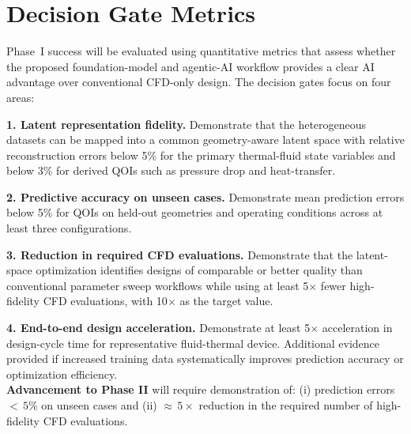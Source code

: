 \section{Decision Gate Metrics}

%
%
%
%

\noindent
Phase~I success will be evaluated using quantitative metrics that assess
whether the proposed foundation-model and agentic-AI workflow provides a clear
AI advantage over conventional CFD-only design. The decision gates focus on
four areas: 

\noindent
{\bf 1. Latent representation fidelity.} 
Demonstrate that the heterogeneous datasets can be mapped into a common
geometry-aware latent space with relative reconstruction errors below 5\% for
the primary thermal-fluid state variables and below 3\% for derived QOIs such
as pressure drop and heat-transfer.

\noindent
{\bf 2. Predictive accuracy on unseen cases.} 
Demonstrate mean prediction errors below 5\% for QOIs on held-out geometries
and operating conditions across at least three configurations.

\noindent
{\bf 3. Reduction in required CFD evaluations.} 
Demonstrate that the latent-space optimization identifies designs of comparable
or better quality than conventional parameter sweep workflows while using at
least 5$\times$ fewer high-fidelity CFD evaluations, with 10$\times$ as the
target value.

\noindent
{\bf 4. End-to-end design acceleration.} 
Demonstrate at least 5$\times$ acceleration in design-cycle time for
representative fluid-thermal device.  Additional evidence provided if increased
training data systematically improves prediction accuracy or optimization
efficiency.
\\[-2ex]


\noindent
{\bf Advancement to Phase II} will require demonstration of: 
(i) prediction errors $ <  \, 5$\% on unseen cases and
(ii)  $\approx \, 5\times$ reduction in the required number of high-fidelity 
      CFD evaluations.
